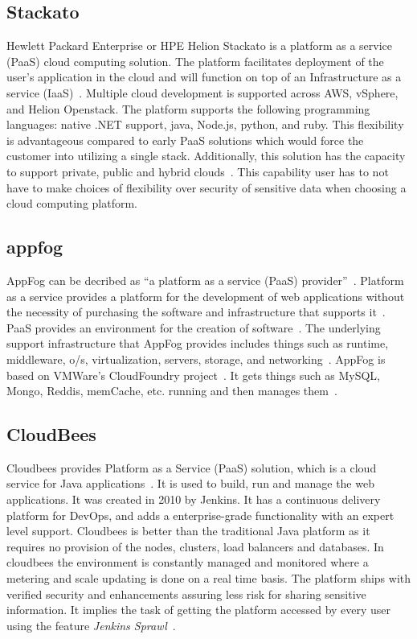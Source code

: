 \subsection{Stackato}
    
Hewlett Packard Enterprise or HPE Helion Stackato is a platform as a
service (PaaS) cloud computing solution.  The platform facilitates
deployment of the user’s application in the cloud and will function on
top of an Infrastructure as a service (IaaS)~\cite{www-hpe}. Multiple
cloud development is supported across AWS, vSphere, and Helion
Openstack.  The platform supports the following programming languages:
native .NET support, java, Node.js, python, and ruby.  This
flexibility is advantageous compared to early PaaS solutions which
would force the customer into utilizing a single stack.  Additionally,
this solution has the capacity to support private, public and hybrid
clouds~\cite{www-virt}. This capability user has to not have to make
choices of flexibility over security of sensitive data when choosing a
cloud computing platform.

    \pv
 
    
\subsection{appfog}

AppFog can be decribed as ``a platform as a service (PaaS)
provider''~\cite{wee}. Platform as a service provides a platform for
the development of web applications without the necessity of
purchasing the software and infrastructure that supports
it~\cite{kepes}. PaaS provides an environment for the creation of
software~\cite{kepes}. The underlying support infrastructure that
AppFog provides includes things such as runtime, middleware, o/s,
virtualization, servers, storage, and networking~\cite{appfog}. AppFog
is based on VMWare’s CloudFoundry project~\cite{wee}. It gets things
such as MySQL, Mongo, Reddis, memCache, etc. running and then manages
them~\cite{tweney}.

    \pv
    
\subsection{CloudBees}

Cloudbees provides Platform as a Service (PaaS) solution, which is a
cloud service for Java applications~\cite{www-cloudbees-wiki}. It is
used to build, run and manage the web applications. It was created in
2010 by Jenkins. It has a continuous delivery platform for DevOps, and
adds a enterprise-grade functionality with an expert level
support. Cloudbees is better than the traditional Java platform as it
requires no provision of the nodes, clusters, load balancers and
databases. In cloudbees the environment is constantly managed and
monitored where a metering and scale updating is done on a real time
basis. The platform ships with verified security and enhancements
assuring less risk for sharing sensitive information. It implies the
task of getting the platform accessed by every user using the feature
\textit{Jenkins Sprawl}~\cite{www-cloudbees-webpage}.

